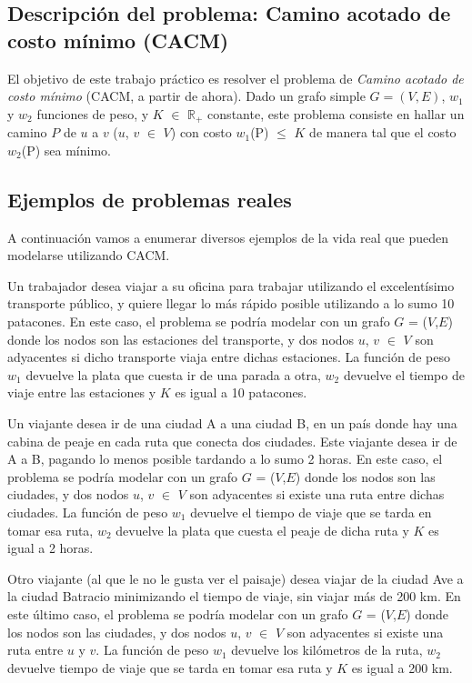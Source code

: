 \subsection{Descripción del problema: Camino acotado de costo mínimo (CACM)}
\label{sub:introduccion-descripcion}

El objetivo de este trabajo práctico es resolver el problema de \emph{Camino acotado de costo mínimo} (CACM, a partir de ahora). Dado un grafo simple $G = (V,E)$, $w_1$ y $w_2$ funciones de peso, y $K$ $\in$ $\mathbb{R}_+$ constante, este problema consiste en hallar un camino $P$ de $u$ a $v$ ($u$, $v$ $\in$ $V$) con costo $w_1$(P) $\leq$ $K$ de manera tal que el costo $w_2$(P) sea mínimo.

\subsection{Ejemplos de problemas reales}
\label{sub:introduccion-ejemplos}

A continuación vamos a enumerar diversos ejemplos de la vida real que pueden modelarse utilizando CACM.

Un trabajador desea viajar a su oficina para trabajar utilizando el excelentísimo transporte público, y quiere llegar lo más rápido posible utilizando a lo sumo 10 patacones. En este caso, el problema se podría modelar con un grafo $G$ = ($V$,$E$) donde los nodos son las estaciones del transporte, y dos nodos $u$, $v$ $\in$ $V$ son adyacentes si dicho transporte viaja entre dichas estaciones. La función de peso $w_1$ devuelve la plata que cuesta ir de una parada a otra, $w_2$ devuelve el tiempo de viaje entre las estaciones y $K$ es igual a 10 patacones.

Un viajante desea ir de una ciudad A a una ciudad B, en un país donde hay una cabina de peaje en cada ruta que conecta dos ciudades. Este viajante desea ir de A a B, pagando lo menos posible tardando a lo sumo 2 horas. En este caso, el problema se podría modelar con un grafo $G$ = ($V$,$E$) donde los nodos son las ciudades, y dos nodos $u$, $v$ $\in$ $V$ son adyacentes si existe una ruta entre dichas ciudades. La función de peso $w_1$ devuelve el tiempo de viaje que se tarda en tomar esa ruta, $w_2$ devuelve la plata que cuesta el peaje de dicha ruta y $K$ es igual a 2 horas.

Otro viajante (al que le no le gusta ver el paisaje) desea viajar de la ciudad Ave a la ciudad Batracio minimizando el tiempo de viaje, sin viajar más de 200 km. En este último caso, el problema se podría modelar con un grafo $G$ = ($V$,$E$) donde los nodos son las ciudades, y dos nodos $u$, $v$ $\in$ $V$ son adyacentes si existe una ruta entre $u$ y $v$. La función de peso $w_1$ devuelve los kilómetros de la ruta, $w_2$ devuelve tiempo de viaje que se tarda en tomar esa ruta y $K$ es igual a 200 km.

